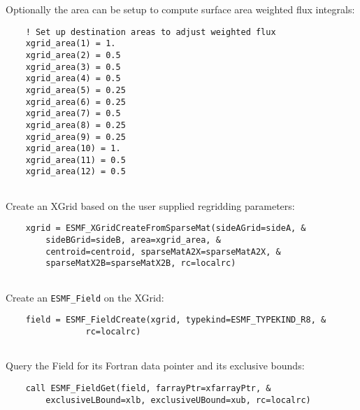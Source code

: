    Optionally the area can be setup to compute surface area weighted flux integrals: 

 \begin{verbatim}
    ! Set up destination areas to adjust weighted flux
    xgrid_area(1) = 1.
    xgrid_area(2) = 0.5
    xgrid_area(3) = 0.5
    xgrid_area(4) = 0.5
    xgrid_area(5) = 0.25
    xgrid_area(6) = 0.25
    xgrid_area(7) = 0.5
    xgrid_area(8) = 0.25
    xgrid_area(9) = 0.25
    xgrid_area(10) = 1.
    xgrid_area(11) = 0.5
    xgrid_area(12) = 0.5
 
\end{verbatim}
 

   Create an XGrid based on the user supplied regridding parameters: 

 \begin{verbatim}
    xgrid = ESMF_XGridCreateFromSparseMat(sideAGrid=sideA, &
        sideBGrid=sideB, area=xgrid_area, &
        centroid=centroid, sparseMatA2X=sparseMatA2X, &
        sparseMatX2B=sparseMatX2B, rc=localrc)
 
\end{verbatim}
 

   Create an {\tt ESMF\_Field} on the XGrid: 

 \begin{verbatim}
    field = ESMF_FieldCreate(xgrid, typekind=ESMF_TYPEKIND_R8, &
                rc=localrc)
 
\end{verbatim}
 

   Query the Field for its Fortran data pointer and its exclusive bounds: 

 \begin{verbatim}
    call ESMF_FieldGet(field, farrayPtr=xfarrayPtr, &
        exclusiveLBound=xlb, exclusiveUBound=xub, rc=localrc)
 
\end{verbatim}
 

